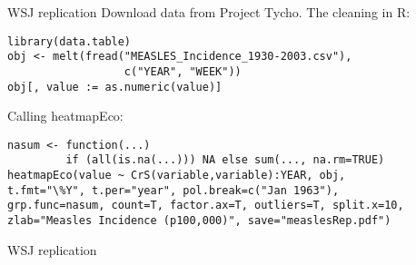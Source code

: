 {
}
\begin{frame}[fragile]{WSJ replication}
        Download data from Project Tycho. The cleaning in R:
        \small
\begin{verbatim}
library(data.table)
obj <- melt(fread("MEASLES_Incidence_1930-2003.csv"),
                  c("YEAR", "WEEK"))
obj[, value := as.numeric(value)]
\end{verbatim}

\normalsize
Calling heatmapEco:

\footnotesize

\begin{verbatim}
nasum <- function(...)
         if (all(is.na(...))) NA else sum(..., na.rm=TRUE)
heatmapEco(value ~ CrS(variable,variable):YEAR, obj,
t.fmt="\%Y", t.per="year", pol.break=c("Jan 1963"),
grp.func=nasum, count=T, factor.ax=T, outliers=T, split.x=10,
zlab="Measles Incidence (p100,000)", save="measlesRep.pdf")
\end{verbatim}

\end{frame}

\begin{frame}{WSJ replication}

\end{frame}


